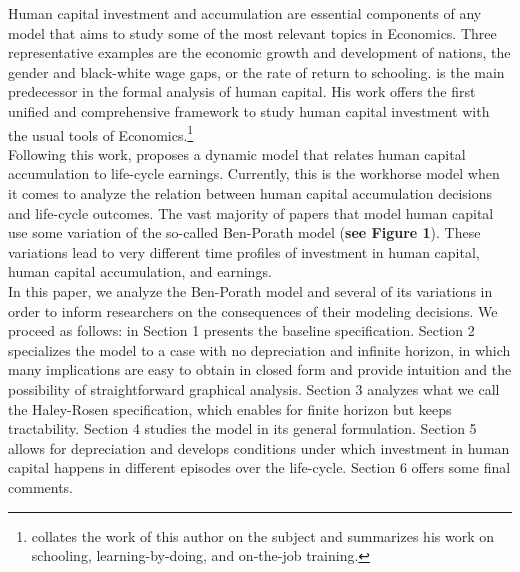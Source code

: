 \noindent Human capital investment and accumulation are essential components of any model that aims to study some of the most relevant topics in Economics. Three representative examples are the economic growth and development of nations, the gender and black-white wage gaps, or the rate of return to schooling. \citet{becker1962investment} is the main predecessor in the formal analysis of human capital. His work offers the first unified and comprehensive framework to study human capital investment with the usual tools of Economics.\footnote{\citet{becker2009human} collates the work of this author on the subject and summarizes his work on schooling, learning-by-doing, and on-the-job training.} \\
\indent Following this work, \citet{ben1967production} proposes a dynamic model that relates human capital accumulation to life-cycle earnings. Currently, this is the workhorse model when it comes to analyze the relation between human capital accumulation decisions and life-cycle outcomes. The vast majority of papers that model human capital use some variation of the so-called Ben-Porath model (\textbf{see Figure 1}). These variations lead to very different time profiles of investment in human capital, human capital accumulation, and earnings.\\
\indent In this paper, we analyze the Ben-Porath model and several of its variations in order to inform researchers on the consequences of their modeling decisions. We proceed as follows: in Section 1 presents the baseline specification. Section 2 specializes the model to a case with no depreciation and infinite horizon, in which many implications are easy to obtain in closed form and provide intuition and the possibility of straightforward graphical analysis. Section 3 analyzes what we call the Haley-Rosen specification, which enables for finite horizon but keeps tractability. Section 4 studies the model in its general formulation. Section 5 allows for depreciation and develops conditions under which investment in human capital happens in different episodes over the life-cycle. Section 6 offers some final comments. \\

